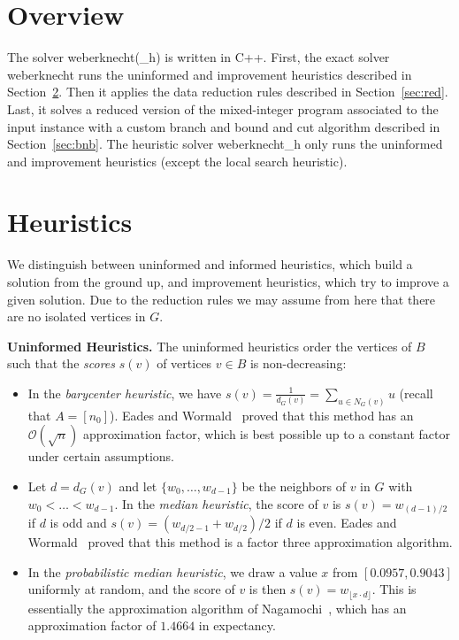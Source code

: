 \documentclass[a4paper,UKenglish,cleveref, autoref, thm-restate]{lipics-v2021}
\begin{document}

\section{Overview}
The solver \textsf{weberknecht(\_h)} is written in C++.
First, the exact solver \textsf{weberknecht} runs the uninformed and improvement heuristics described in Section~\ref{sec:heu}.
Then it applies the data reduction rules described in Section~\ref{sec:red}.
Last, it solves a reduced version of the mixed-integer program associated to the input instance with a custom branch and bound and cut algorithm described in Section~\ref{sec:bnb}.
The heuristic solver \textsf{weberknecht\_h} only runs the uninformed and improvement heuristics (except the local search heuristic).


\section{Heuristics}\label{sec:heu}
We distinguish between uninformed and informed heuristics, which build a solution from the ground up, and improvement heuristics, which try to improve a given solution.
Due to the reduction rules we may assume from here that there are no isolated vertices in $G$.

\medskip
\noindent
\textbf{Uninformed Heuristics.}
The uninformed heuristics order the vertices of $B$ such that the \emph{scores} $s(v)$ of vertices $v \in B$ is non-decreasing:
\begin{itemize}
\item In the \emph{barycenter heuristic}, we have $s(v) = \frac{1}{d_G(v)} = \sum_{u \in N_G(v)} u$ (recall that $A = [n_0]$). Eades and Wormald~\cite{eades1994edge} proved that this method has an $\mathcal{O}(\sqrt{n})$ approximation factor, which is best possible up to a constant factor under certain assumptions.
\item Let $d = d_G(v)$ and let $\{w_0, \dots, w_{d-1}\}$ be the neighbors of $v$ in $G$ with $w_0 < \dots < w_{d-1}$.
In the \emph{median heuristic}, the score of $v$ is $s(v) = w_{(d-1)/2}$ if $d$ is odd and $s(v) = (w_{d/2 - 1} + w_{d/2})/2$ if $d$ is even.
Eades and Wormald~\cite{eades1994edge} proved that this method is a factor three approximation algorithm.
\item In the \emph{probabilistic median heuristic}, we draw a value $x$ from $[0.0957, 0.9043]$ uniformly at random, and the score of $v$ is then $s(v) = w_{\lfloor x \cdot d \rfloor}$.
This is essentially the approximation algorithm of Nagamochi~\cite{nagamochi2005improved}, which has an approximation factor of $1.4664$ in expectancy.
\end{itemize}
\end{document}
